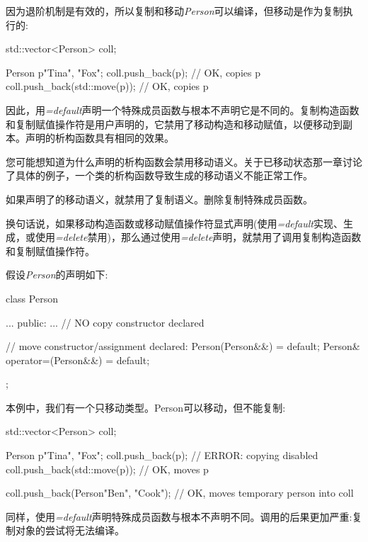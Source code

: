因为退阶机制是有效的，所以复制和移动\textit{Person}可以编译，但移动是作为复制执行的:\par

\begin{codebox}[cpp]
std::vector<Person> coll;

Person p{"Tina", "Fox"};
coll.push_back(p); // OK, copies p
coll.push_back(std::move(p)); // OK, copies p
\end{codebox}

因此，用\textit{=default}声明一个特殊成员函数与根本不声明它是不同的。复制构造函数和复制赋值操作符是用户声明的，它禁用了移动构造和移动赋值，以便移动到副本。声明的析构函数具有相同的效果。\par

您可能想知道为什么声明的析构函数会禁用移动语义。关于已移动状态那一章讨论了具体的例子，一个类的析构函数导致生成的移动语义不能正常工作。\par


如果声明了的移动语义，就禁用了复制语义。删除复制特殊成员函数。\par

换句话说，如果移动构造函数或移动赋值操作符显式声明(使用\textit{=default}实现、生成，或使用\textit{=delete}禁用)，那么通过使用\textit{=delete}声明，就禁用了调用复制构造函数和复制赋值操作符。\par

假设\textit{Person}的声明如下:\par

\begin{codebox}[cpp]
class Person {
  ...
  public:
  ...
  // NO copy constructor declared

  // move constructor/assignment declared:
  Person(Person&&) = default;
  Person& operator=(Person&&) = default;
};
\end{codebox}

本例中，我们有一个只移动类型。Person可以移动，但不能复制:\par

\begin{codebox}[cpp]
std::vector<Person> coll;

Person p{"Tina", "Fox"};
coll.push_back(p); // ERROR: copying disabled
coll.push_back(std::move(p)); // OK, moves p

coll.push_back(Person{"Ben", "Cook"}); // OK, moves temporary person into coll
\end{codebox}

同样，使用\textit{=default}声明特殊成员函数与根本不声明不同。调用的后果更加严重:复制对象的尝试将无法编译。\par

